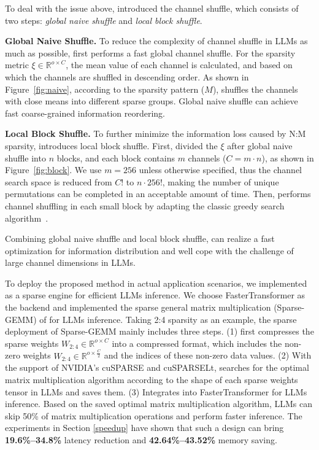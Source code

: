 To deal with the issue above, \name introduced the channel shuffle, which consists of two steps: \textit{global naive shuffle} and \textit{local block shuffle}. %

\textbf{Global Naive Shuffle.} To reduce the complexity of channel shuffle in LLMs as much as possible, \name first performs a fast global channel shuffle. For the sparsity metric $\xi \in \mathbb{R}^{o\times C}$, the mean value of each channel is calculated, and based on which the channels are shuffled in descending order. As shown in Figure~\ref{fig:naive}, according to the sparsity pattern ($M$), \name shuffles the channels with close means into different sparse groups. Global naive shuffle can achieve fast coarse-grained information reordering.

\textbf{Local Block Shuffle.} 
To further minimize the information loss caused by N:M sparsity, \name introduces local block shuffle.
First, \name divided the $\xi$ after global naive shuffle into $n$ blocks, and each block contains $m$ channels ($C=m\cdot n$), as shown in Figure~\ref{fig:block}. We use $m = 256$ unless otherwise specified, thus the channel search space is reduced from \textbf{$C!$} to \textbf{$n\cdot256!$}, making the number of unique permutations can be completed in an acceptable amount of time.  
Then, \name performs channel shuffling in each small block by adapting the classic greedy search algorithm~\cite{ji2018tetris, pool2021channel}. 

Combining global naive shuffle and local block shuffle, \name can realize a fast optimization for information distribution and well cope with the challenge of large channel dimensions in LLMs.

To deploy the proposed method in actual application scenarios, we implemented \name as a sparse engine for efficient LLMs inference. We choose FasterTransformer\cite{FasterTransformer} as the backend and implemented the sparse general matrix multiplication (Sparse-GEMM) of \name for LLMs inference. Taking 2:4 sparsity as an example, the sparse deployment of Sparse-GEMM mainly includes three steps. (1) \name first compresses the sparse weights $ W_{2:4}\in \mathbb{R}^{o\times C}$ into a compressed format, which includes the non-zero weights $ W_{2:4}\in \mathbb{R}^{o\times \frac{C}{2}} $ and the indices of these non-zero data values. (2) With the support of NVIDIA's cuSPARSE and cuSPARSELt, \name searches for the optimal matrix multiplication algorithm according to the shape of each sparse weights tensor in LLMs and saves them. (3) Integrates \name into FasterTransformer for LLMs inference.
Based on the saved optimal matrix multiplication algorithm, LLMs can skip 50\% of matrix multiplication operations and perform faster inference. The experiments in Section \ref{speedup} have shown that such a design can bring \textbf{19.6\%--34.8\%} latency reduction and \textbf{42.64\%--43.52\%} memory saving.

